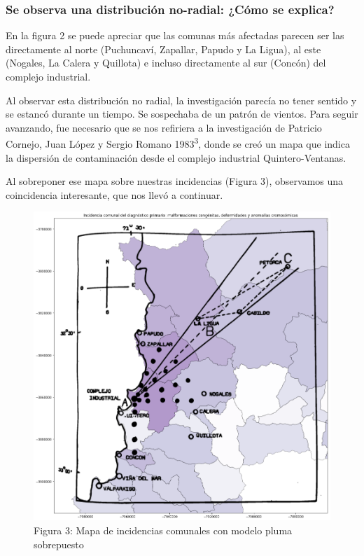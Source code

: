 \documentclass[]{article}
\begin{document}
\hypertarget{se-observa-una-distribuciuxf3n-no-radial-cuxf3mo-se-explica}{%
\subsubsection{Se observa una distribución no-radial: ¿Cómo se
explica?}\label{se-observa-una-distribuciuxf3n-no-radial-cuxf3mo-se-explica}}

En la figura 2 se puede apreciar que las comunas más afectadas parecen
ser las directamente al norte (Puchuncaví, Zapallar, Papudo y La Ligua),
al este (Nogales, La Calera y Quillota) e incluso directamente al sur
(Concón) del complejo industrial.

Al observar esta distribución no radial, la investigación parecía no
tener sentido y se estancó durante un tiempo. Se sospechaba de un patrón
de vientos. Para seguir avanzando, fue necesario que se nos refiriera a
la investigación de Patricio Cornejo, Juan López y Sergio Romano
1983\textsuperscript{{3}}, donde se creó un mapa que indica la
dispersión de contaminación desde el complejo industrial
Quintero-Ventanas.

Al sobreponer ese mapa sobre nuestras incidencias (Figura 3), observamos
una coincidencia interesante, que nos llevó a continuar.

\begin{figure}
\centering
\includegraphics{assets/mapa-pluma.png}
\caption{Figura 3: Mapa de incidencias comunales con modelo pluma
sobrepuesto}
\end{figure}
\end{document}
